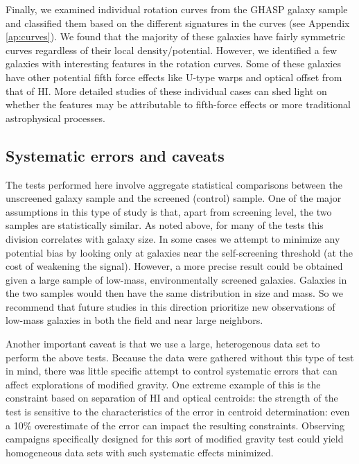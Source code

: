 \documentclass[twocolappendix, numberedappendix]{emulateapj}
\begin{document}
Finally, we examined individual rotation curves from the GHASP 
galaxy sample and classified them based on the different signatures 
in the curves (see Appendix \ref{ap:curves}).
We found that the majority of these galaxies 
have fairly symmetric curves regardless
of their local density/potential. However, we identified a 
few galaxies with interesting features in the rotation curves.
Some of these galaxies have other potential fifth force effects
like U-type warps and optical offset from that of HI.
More detailed studies of these individual cases can shed light
on whether the features may be attributable to fifth-force effects or
more traditional astrophysical processes.


\subsection{Systematic errors and caveats}
\label{sec:caveat}
The  tests performed here involve aggregate statistical
comparisons between the unscreened galaxy sample and the screened (control) sample.
One of the major assumptions in this type of study is that, apart
from screening level, the two samples are statistically similar.  As noted
above, for many of the tests this division correlates with galaxy size. 
In some cases we attempt to minimize any potential bias
by looking only at galaxies near the self-screening threshold (at the cost
of weakening the signal).  However,
a more precise result could be obtained given a large sample of low-mass,
environmentally screened galaxies.  Galaxies in the two samples would then
have the same distribution in size and mass. So we recommend that
future studies in this direction prioritize new observations of low-mass
galaxies in both the field and near large neighbors.

Another important caveat is that we use a large, heterogenous data set to
perform the above tests.  Because the data were gathered without this
type of test in mind, there was little specific attempt to control
systematic errors that can affect explorations of modified gravity.
One extreme example of this is the constraint based on separation of
HI and optical centroids: the strength of the test is sensitive to the
 characteristics of the error in centroid determination: even a
10\% overestimate of the error can impact the
resulting constraints.  Observing campaigns specifically designed for this
sort of modified gravity test could yield homogeneous data sets with such
systematic effects minimized.
\end{document}
